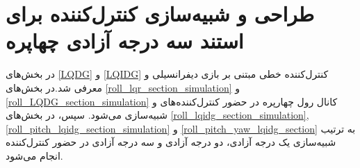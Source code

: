 \chapter{طراحی و شبیه‌سازی کنترل‌کننده برای استند سه درجه آزادی چهاپره}\label{MIL}
در بخش‌های
\ref{LQDG}
و
\ref{LQIDG}
کنترل‌کننده خطی مبتنی بر بازی دیفرانسیلی  و  معرفی شد.در بخش‌های
\ref{roll_lqr_section_simulation}
و
\ref{roll_LQDG_section_simulation}
کانال 	رول چهارپره در حضور کنترل‌کننده‌های  و
شبیه‌سازی می‌شود. سپس، در بخش‌های
\ref{roll_lqidg_section_simulation},
\ref{roll_pitch_lqidg_section_simulation}
و
\ref{roll_pitch_yaw_lqidg_section}
به‌ ترتیب شبیه‌سازی یک درجه آزادی، دو درجه آزادی و سه درجه آزادی در حضور کنترل‌کننده‌  انجام می‌شود.
